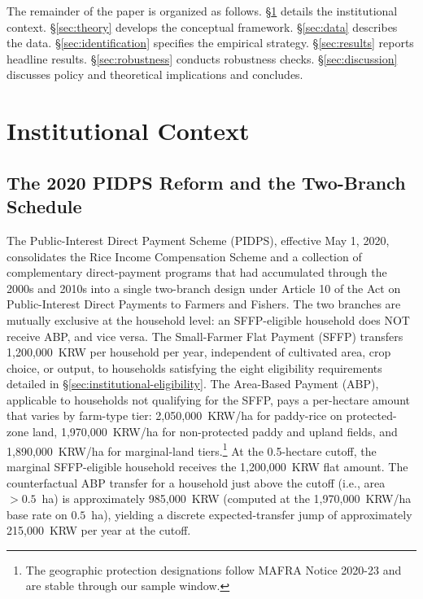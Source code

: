 \documentclass[12pt, a4paper]{article}
\begin{document}
The remainder of the paper is organized as follows. \S\ref{sec:institutional} details the institutional context. \S\ref{sec:theory} develops the conceptual framework. \S\ref{sec:data} describes the data. \S\ref{sec:identification} specifies the empirical strategy. \S\ref{sec:results} reports headline results. \S\ref{sec:robustness} conducts robustness checks. \S\ref{sec:discussion} discusses policy and theoretical implications and concludes.

\section{Institutional Context}
\label{sec:institutional}

\subsection{The 2020 PIDPS Reform and the Two-Branch Schedule}
\label{sec:institutional-reform}

The Public-Interest Direct Payment Scheme (PIDPS), effective May 1, 2020, consolidates the Rice Income Compensation Scheme and a collection of complementary direct-payment programs that had accumulated through the 2000s and 2010s into a single two-branch design under Article 10 of the Act on Public-Interest Direct Payments to Farmers and Fishers. The two branches are mutually exclusive at the household level: an SFFP-eligible household does NOT receive ABP, and vice versa. The Small-Farmer Flat Payment (SFFP) transfers 1{,}200{,}000~KRW per household per year, independent of cultivated area, crop choice, or output, to households satisfying the eight eligibility requirements detailed in \S\ref{sec:institutional-eligibility}. The Area-Based Payment (ABP), applicable to households not qualifying for the SFFP, pays a per-hectare amount that varies by farm-type tier: 2{,}050{,}000~KRW/ha for paddy-rice on protected-zone land, 1{,}970{,}000~KRW/ha for non-protected paddy and upland fields, and 1{,}890{,}000~KRW/ha for marginal-land tiers.\footnote{The geographic protection designations follow MAFRA Notice 2020-23 and are stable through our sample window.} At the 0.5-hectare cutoff, the marginal SFFP-eligible household receives the 1{,}200{,}000~KRW flat amount. The counterfactual ABP transfer for a household just above the cutoff (i.e., area $> 0.5$~ha) is approximately 985{,}000~KRW (computed at the 1{,}970{,}000~KRW/ha base rate on $0.5$~ha), yielding a discrete expected-transfer jump of approximately 215{,}000~KRW per year at the cutoff.
\end{document}
